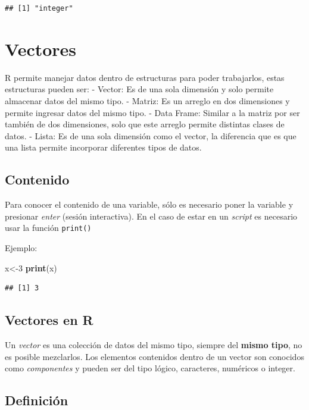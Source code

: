 \documentclass[
]{book}
\newenvironment{Shaded}{\begin{snugshade}}{\end{snugshade}}
\newcommand{\DecValTok}[1]{\textcolor[rgb]{0.00,0.00,0.81}{#1}}
\newcommand{\FunctionTok}[1]{\textcolor[rgb]{0.13,0.29,0.53}{\textbf{#1}}}
\newcommand{\NormalTok}[1]{#1}
\newcommand{\OtherTok}[1]{\textcolor[rgb]{0.56,0.35,0.01}{#1}}
\begin{document}
\begin{verbatim}
## [1] "integer"
\end{verbatim}

\chapter{Vectores}\label{estructura}

R permite manejar datos dentro de estructuras para poder trabajarlos, estas estructuras pueden ser:
- Vector: Es de una sola dimensión y solo permite almacenar datos del mismo tipo.
- Matriz: Es un arreglo en dos dimensiones y permite ingresar datos del mismo tipo.
- Data Frame: Similar a la matriz por ser también de dos dimensiones, solo que este arreglo permite distintas clases de datos.
- Lista: Es de una sola dimensión como el vector, la diferencia que es que una lista permite incorporar diferentes tipos de datos.

\section{Contenido}\label{contenido}

Para conocer el contenido de una variable, sólo es necesario poner la variable y presionar \emph{enter} (sesión interactiva). En el caso de estar en un \emph{script} es necesario usar la función \texttt{print()}

Ejemplo:

\begin{Shaded}
\begin{Highlighting}[]
\NormalTok{x}\OtherTok{\textless{}{-}}\DecValTok{3}
\FunctionTok{print}\NormalTok{(x)}
\end{Highlighting}
\end{Shaded}

\begin{verbatim}
## [1] 3
\end{verbatim}

\section{Vectores en R}\label{vectors}

Un \emph{vector} es una colección de datos del mismo tipo, siempre del \textbf{mismo tipo}, no es posible mezclarlos. Los elementos contenidos dentro de un vector son conocidos como \emph{componentes} y pueden ser del tipo lógico, caracteres, numéricos o integer.

\section{Definición}\label{definiciuxf3n}
\end{document}
